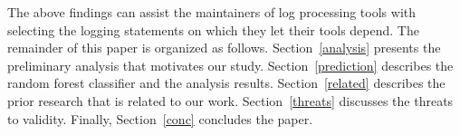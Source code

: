 The above findings can assist the maintainers of log processing tools with selecting the logging statements on which they let their tools depend. %
%
%
%
%
%
%
%
%
% 
The remainder of this paper is organized as follows. Section~\ref{analysis} presents the preliminary analysis that motivates our study. Section~\ref{prediction} describes the random forest classifier and the analysis results. Section~\ref{related} describes the prior research that is related to our work. Section~\ref{threats} discusses the threats to validity. Finally, Section~\ref{conc} concludes the paper.
 
 
